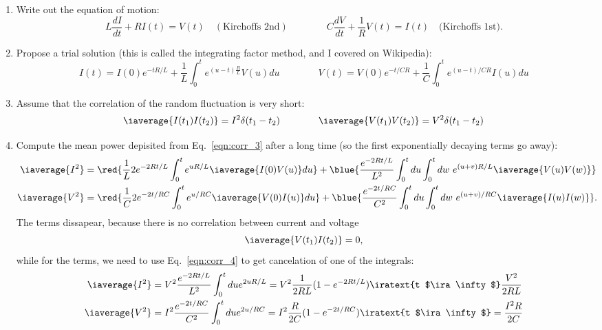  \begin{enumerate}
 \item Write out the equation of motion:
   \begin{equation}\label{eqn:corr_2}
     L\frac{dI}{dt} + RI(t) = V(t) \quad (\text{Kirchoffs 2nd})\qquad\qquad C\frac{dV}{dt} + \frac{1}{R}V(t) = I(t) \quad \text{(Kirchoffs 1st)}.
   \end{equation}
 \item Propose  a trial solution (this  is called the integrating  factor method,
   and I covered on Wikipedia):
   \begin{equation}\label{eqn:corr_3}
     I(t) = I(0)e^{-tR/L} + \frac{1}{L}\int_0^t e^{({u-t})\frac{R}{L}}V(u)du\qquad\qquad V(t) = V(0)e^{-t/CR} + \frac{1}{C}\int_0^t e^{({u-t})/{CR}{}}I(u)du
   \end{equation}
 \item Assume that the correlation of the random fluctuation is very short:
   \begin{equation}\label{eqn:corr_4}
     \iaverage{I(t_1)I(t_2)} = I^2\delta(t_1-t_2)\qquad\qquad \iaverage{V(t_1)V(t_2)} = V^2\delta(t_1-t_2)
   \end{equation}
 \item Compute the mean power  depisited from Eq.~\eqref{eqn:corr_3} after a long
   time (so the first exponentially decaying terms go away):
   \begin{equation}
     \begin{aligned}
       \iaverage{I^2} & =\red{ \frac{1}{L}2e^{-2Rt/L}\int_0^{t}e^{uR/L} \iaverage{I(0)V(u)}du} + \blue{\frac{e^{-2Rt/L}}{L^2}\int_0^tdu\int_0^tdw\ e^{(u+v)R/L}\iaverage{V(u)V(w)}}\\
       \iaverage{V^2} & =\red{ \frac{1}{C}2e^{-2t/RC}\int_0^{t}e^{u/RC} \iaverage{V(0)I(u)}du} + \blue{\frac{e^{-2t/RC}}{C^2}\int_0^tdu\int_0^tdw\ e^{(u+v)/RC}\iaverage{I(u)I(w)}}.\\
     \end{aligned}
   \end{equation}
   \noindent  The   terms  dissapear, because  there  is no  correlation
   between current and voltage
   \[
     \iaverage{V(t_1)I(t_2)} = 0,
   \]
   \noindent   while    for   the       terms,   we   need    to   use
   Eq.~\eqref{eqn:corr_4} to get cancelation of one of the integrals:
   \begin{equation}\label{eqn:corr_5}
     \begin{aligned}
       \iaverage{I^2}& = {V^2\frac{e^{-2Rt/L}}{L^2}\int_0^tdu e^{2uR/L}} = V^2\frac{1}{2RL}(1-e^{-2Rt/L}) \iratext{t $\ira \infty$} \frac{V^2}{2RL}\\
       \iaverage{V^2} & = {I^2\frac{e^{-2t/RC}}{C^2}\int_0^tdu e^{2u/RC}} = I^2\frac{R}{2C}(1-e^{-2t/RC})\iratext{t $\ira \infty$} = \frac{I^2R}{2C}\\
     \end{aligned}
   \end{equation}


\end{enumerate}
